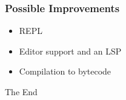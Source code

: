\documentclass{beamer}
\begin{document}
\begin{frame}
    \frametitle{Possible Improvements}
    \begin{itemize}
        \item REPL
        \item Editor support and an LSP
        \item Compilation to bytecode
    \end{itemize}
\end{frame}

\begin{frame}
    \begin{center}
        \Huge The End
    \end{center}
\end{frame}
\end{document}
